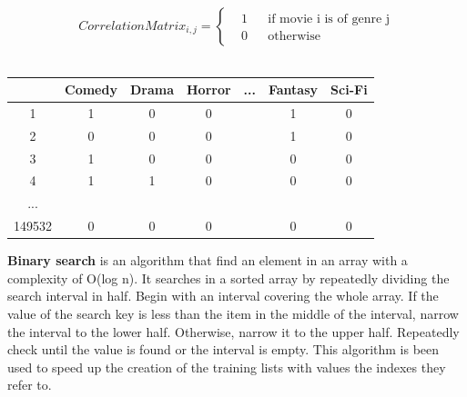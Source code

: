 \documentclass{article}
\begin{document}
\begin{equation}
      \label{eqn:movieMatrix}
      CorrelationMatrix_{i,j} = \left \{
            \begin{aligned}
                  &1 && \text{if movie i is of genre j}\\
                  &0 && \text{otherwise}
            \end{aligned} \right.
\end{equation} \\ 

\begin{center}
      \begin{tabular}{ | c | c | c | c | c | c | c |} 
        \hline
        \rowcolor{lightgray}  & Comedy & Drama & Horror & ... & Fantasy & Sci-Fi \\ 
        \hline
         \cellcolor{lightgray}1 & 1 & 0 & 0 &  & 1 & 0 \\ 
        \hline
        \cellcolor{lightgray}2 & 0 & 0 & 0 &  & 1 & 0 \\ 
        \hline
        \cellcolor{lightgray}3 & 1 & 0 & 0 &  & 0 & 0\\
        \hline
        \cellcolor{lightgray}4 & 1 & 1 & 0 &  & 0 & 0\\
        \hline
        \cellcolor{lightgray}... &  &  &  &  &  & \\ 
        \hline
        \cellcolor{lightgray}149532 & 0 & 0 & 0 &  & 0 & 0\\
        \hline
      \end{tabular}
\end{center}

\newpage
\textbf{Binary search} is an algorithm that find an element in an array with a complexity of O(log n). It searches in a sorted array by repeatedly dividing the search interval in half. Begin with an interval covering the whole array. If the value of the search key is less than the item in the middle of the interval, narrow the interval to the lower half. Otherwise, narrow it to the upper half. Repeatedly check until the value is found or the interval is empty.
This algorithm is been used to speed up the creation of the training lists with values the indexes they refer to.\\
\end{document}
